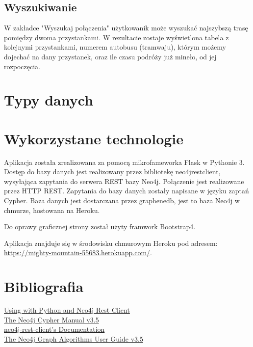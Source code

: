 \documentclass[12pt]{article}
\begin{document}
\subsection{Wyszukiwanie}
W zakładce "Wyszukaj połączenia" użytkowanik może wyszukać najszybszą trasę pomiędzy dwoma przystankami. W rezultacie zostaje wyświetlona tabela z kolejnymi przystankami, numerem autobusu (tramwaju), którym możemy dojechać na dany przystanek, oraz ile czasu podróży już mineło, od jej rozpoczęcia.

\section{Typy danych}

\section{Wykorzystane technologie}
Aplikacja została zrealizowana za pomocą mikrofameworka Flask w Pythonie 3. Dostęp do bazy danych jest realizowany przez bibliotekę neo4jrestclient, wysyłająca zapytania do serwera REST bazy Neo4j. Połączenie jest realizowane przez HTTP REST. Zapytania do bazy danych zostały napisane w języku zaptań Cypher. Baza danych jest dostarczana przez graphenedb, jest to baza Neo4j w chmurze, hostowana na Heroku.

Do oprawy graficznej strony został użyty framwork Bootstrap4.

Aplikacja znajduje się w środowisku chmurowym Heroku pod adresem:
\url{https://mighty-mountain-55683.herokuapp.com/}.


\section{Bibliografia}
\href{https://devcenter.heroku.com/articles/graphenedb#using-with-python-and-neo4j-rest-client}{Using with Python and Neo4j Rest Client}
\\
\href{https://neo4j.com/docs/cypher-manual/current/}{The Neo4j Cypher Manual v3.5}
\\
\href{https://neo4j-rest-client.readthedocs.io/en/latest/info.html}{neo4j-rest-client’s Documentation}
\\
\href{https://neo4j.com/docs/graph-algorithms/current/}{The Neo4j Graph Algorithms User Guide v3.5}
\end{document}
